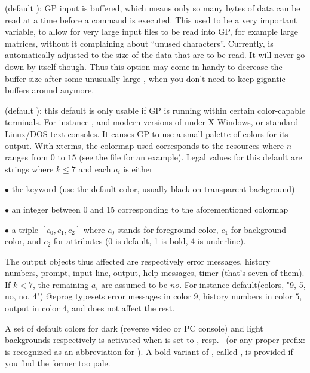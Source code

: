  (default ): GP input is buffered, which means
only so many bytes of data can be read at a time before a command is
executed. This used to be a very important variable, to allow for very
large input files to be read into GP, for example large matrices, without it
complaining about ``unused characters''. Currently,  is
automatically adjusted to the size of the data that are to be read. It will
never go down by itself though. Thus this option may come in handy to decrease
the buffer size after some unusually large , when you don't need to
keep gigantic buffers around anymore.

 (default ): this default is only usable if GP
\label{se:colors}
is running within certain color-capable terminals. For instance ,
 and modern versions of  under X Windows, or
standard Linux/DOS text consoles. It causes GP to use a small palette of
colors for its output. With xterms, the colormap used corresponds to the
resources  where $n$ ranges from $0$ to $15$ (see the
file  for an example). Legal values for this default are
strings  where $k\le7$ and each $a_i$ is either

\noindent $\bullet$ the keyword  (use the default color, usually
black on transparent background)

\noindent $\bullet$ an integer between 0 and 15 corresponding to the
aforementioned colormap

\noindent $\bullet$ a triple $[c_0,c_1,c_2]$ where $c_0$ stands for foreground
color, $c_1$ for background color, and $c_2$ for attributes (0 is default, 1 
is bold, 4 is underline).

The output objects thus affected are respectively error messages,
history numbers, prompt, input line, output, help messages, timer (that's
seven of them). If $k < 7$, the remaining $a_i$ are assumed to be $no$. For
instance
%
\bprog
default(colors, "9, 5, no, no, 4")
@eprog
\noindent
typesets error messages in color $9$, history numbers in color $5$, output in
color $4$, and does not affect the rest.

A set of default colors for dark (reverse video or PC console) and light
backgrounds respectively is activated when  is set to
, resp.~ (or any proper prefix:  is
recognized as an abbreviation for ). A bold variant of
, called , is provided if you find the former too
pale.

